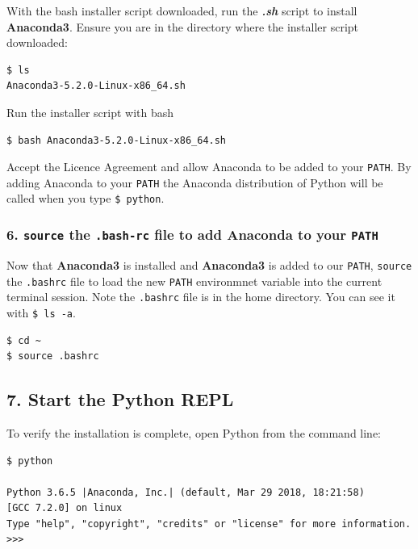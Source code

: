 \documentclass{book}
\begin{document}
With the bash installer script downloaded, run the \textbf{\emph{.sh}}
script to install \textbf{Anaconda3}. Ensure you are in the directory
where the installer script downloaded:

\begin{lstlisting}
$ ls
Anaconda3-5.2.0-Linux-x86_64.sh
\end{lstlisting}

Run the installer script with bash

\begin{lstlisting}
$ bash Anaconda3-5.2.0-Linux-x86_64.sh
\end{lstlisting}

Accept the Licence Agreement and allow Anaconda to be added to your
\lstinline!PATH!. By adding Anaconda to your \lstinline!PATH! the
Anaconda distribution of Python will be called when you type
\lstinline!$ python!.

    \subsubsection{\texorpdfstring{6. \texttt{source} the \texttt{.bash-rc}
file to add Anaconda to your
\texttt{PATH}}{6. source the .bash-rc file to add Anaconda to your PATH}}\label{source-the-.bash-rc-file-to-add-anaconda-to-your-path}

Now that \textbf{Anaconda3} is installed and \textbf{Anaconda3} is added
to our \lstinline!PATH!, \lstinline!source! the \lstinline!.bashrc! file
to load the new \lstinline!PATH! environmnet variable into the current
terminal session. Note the \lstinline!.bashrc! file is in the home
directory. You can see it with \lstinline!$ ls -a!.

\begin{lstlisting}
$ cd ~
$ source .bashrc
\end{lstlisting}

    \subsection{7. Start the Python REPL}\label{start-the-python-repl}

To verify the installation is complete, open Python from the command
line:

\begin{lstlisting}
$ python

Python 3.6.5 |Anaconda, Inc.| (default, Mar 29 2018, 18:21:58)
[GCC 7.2.0] on linux
Type "help", "copyright", "credits" or "license" for more information.
>>>
\end{lstlisting}
\end{document}
